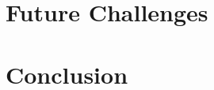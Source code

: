 \documentclass[11pt,a4paper,openright]{book}
\theoremstyle{plain}
\theoremstyle{definition}
\begin{document}
\lipsum[6]

\section{Future Challenges}

\lipsum[3-5]


\section{Conclusion}

\lipsum[8]


\singlespacing

  

\clearpage



\appendix




\end{document}
